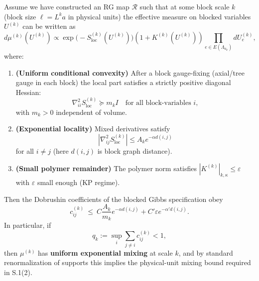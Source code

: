 \begin{theorem}
\label{thm:rg_dobrushin_mixing}
Assume we have constructed an RG map $\mathcal{R}$ such that at some block scale $k$ (block size $\ell=L^k a$ in physical units) the effective measure on blocked variables $U^{(k)}$ can be written as
\begin{equation}
d\mu^{(k)}(U^{(k)}) \propto \exp\bigl(-S^{(k)}_{\mathrm{loc}}(U^{(k)})\bigr)(1+K^{(k)}(U^{(k)}))\prod_{e\in E(\Lambda_{a_k})}dU^{(k)}_e,
\end{equation}
where:
\begin{enumerate}
    \item \textbf{(Uniform conditional convexity)} After a block gauge-fixing (axial/tree gauge in each block) the local part satisfies a strictly positive diagonal Hessian:
    \begin{equation}
    \nabla^2_{ii}S^{(k)}_{\mathrm{loc}} \succeq m_k I
    \quad\text{for all block-variables }i,
    \end{equation}
    with $m_k>0$ independent of volume.

    \item \textbf{(Exponential locality)} Mixed derivatives satisfy
    \begin{equation}
    |\nabla^2_{ij}S^{(k)}_{\mathrm{loc}}|\le A_k e^{-\alpha d(i,j)}
    \end{equation}
    for all $i\ne j$ (here $d(i,j)$ is block graph distance).

    \item \textbf{(Small polymer remainder)} The polymer norm satisfies $|K^{(k)}|_{k,\kappa}\le \varepsilon$ with $\varepsilon$ small enough (KP regime).
\end{enumerate}

Then the Dobrushin coefficients of the blocked Gibbs specification obey
\begin{equation}
c^{(k)}_{ij}\ \le\ C\frac{A_k}{m_k}e^{-\alpha d(i,j)} + C'\varepsilon e^{-\alpha' d(i,j)}.
\end{equation}
In particular, if
\begin{equation}
q_k:=\sup_i \sum_{j\ne i} c^{(k)}_{ij}<1,
\end{equation}
then $\mu^{(k)}$ has \textbf{uniform exponential mixing} at scale $k$, and by standard renormalization of supports this implies the physical-unit mixing bound required in S.1(2).
\end{theorem}

